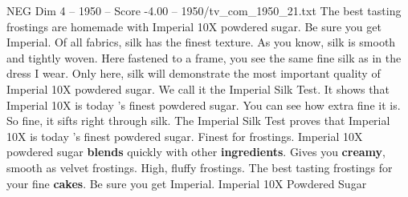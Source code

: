 \begin{textsample}{NEG Dim 4 – 1950 – Score -4.00 – 1950/tv\_com\_1950\_21.txt}  \label{ex:f4_neg_008}
The best tasting frostings are homemade with Imperial 10X powdered sugar.
Be sure you get Imperial.
Of all fabrics, silk has the finest texture.
As you know, silk is smooth and tightly woven.
Here fastened to a frame, you see the same fine silk as in the dress I wear.
Only here, silk will demonstrate the most important quality of Imperial 10X powdered sugar.
We call it the Imperial Silk Test.
It shows that Imperial 10X is today 's finest powdered sugar.
You can see how extra fine it is.
So fine, it sifts right through silk.
The Imperial Silk Test proves that Imperial 10X is today 's finest powdered sugar.
Finest for frostings.
Imperial 10X powdered sugar \textbf{blends} quickly with other \textbf{ingredients}.
Gives you \textbf{creamy}, smooth as velvet frostings.
High, fluffy frostings.
The best tasting frostings for your fine \textbf{cakes}.
Be sure you get Imperial.
Imperial 10X Powdered Sugar

\end{textsample}

